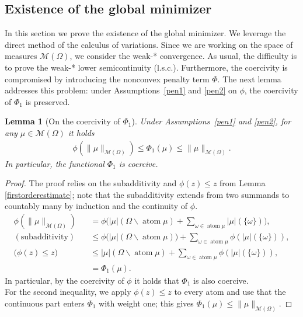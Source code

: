 \documentclass[11pt]{amsart}
\newtheorem{lemma}[theorem]{Lemma}
\theoremstyle{definition}
\theoremstyle{remark}
\DeclareMathOperator{\atom}{atom}
\begin{document}
\subsection{Existence of the global minimizer}
In this section we prove the existence of the global minimizer. 
We leverage the direct method of the calculus of variations. 
Since we are working on the space of measures $\mathcal{M}(\Omega)$, we consider the weak-* convergence. 
As usual, the difficulty is to prove the weak-* lower semicontinuity (l.s.c.). 
Furthermore, the coercivity is compromised by introducing the nonconvex penalty term $\Phi$. 
The next lemma addresses this problem: under Assumptions~\ref{pen1} and \ref{pen2} on $\phi$, the coercivity of $\Phi_1$ is preserved.

\begin{lemma}[On the coercivity of $\Phi_1$] \label{lem:coercivity}
Under Assumptions~\ref{pen1} and \ref{pen2}, for any $\mu \in \mathcal{M}(\Omega)$ it holds
\begin{align*}
	\phi(\|\mu\|_{\mathcal{M}(\Omega)}) \le \Phi_1(\mu) \le \|\mu\|_{\mathcal{M}(\Omega)}.
\end{align*}
In particular, the functional $\Phi_1$ is coercive.
\end{lemma}
\begin{proof}
The proof relies on the subadditivity and $\phi(z) \le z$ from Lemma
\ref{firstorderestimate}; note that the subadditivity extends from two summands
to countably many by induction and the continuity of $\phi$.
\begin{align*}
	\phi(\|\mu\|_{\mathcal{M}(\Omega)}) &= \phi \bigg(|\mu|(\Omega \backslash \atom \mu) + \sum_{\omega \in \atom \mu } |\mu|(\{\omega\}) \bigg),\\
	(\text{subadditivity})\quad
	& \le \phi\big(|\mu|(\Omega\backslash \atom \mu)\big) + \sum_{\omega \in \atom \mu } \phi(|\mu|(\{\omega\})), \\
	\big(\phi(z) \le z\big)\quad
	& \le |\mu|(\Omega\backslash \atom \mu) + \sum_{\omega \in  \atom \mu} \phi(|\mu|(\{\omega\})),\\
	& = \Phi_1(\mu).
\end{align*}
In particular, by the coercivity of $\phi$ it holds that $\Phi_1$ is also coercive. \\
For the second inequality, we apply $\phi(z) \le z$ to every atom and use that the continuous part enters $\Phi_1$ with weight one; this gives $\Phi_1(\mu) \le \|\mu\|_{\mathcal{M}(\Omega)}$.
\end{proof}
\end{document}
